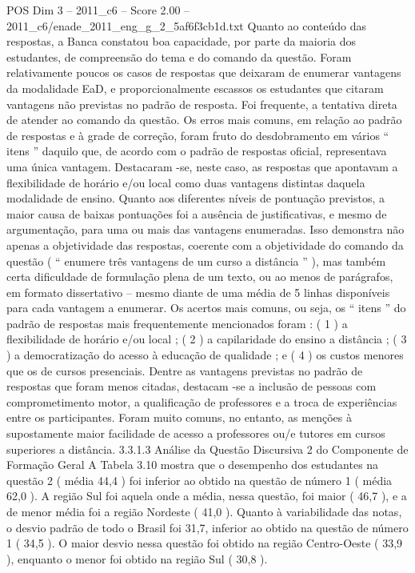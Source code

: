 \begin{textsample}{POS Dim 3 – 2011\_c6 – Score 2.00 – 2011\_c6/enade\_2011\_eng\_g\_2\_5af6f3cb1d.txt}
Quanto ao conteúdo das respostas, a Banca constatou boa capacidade, por parte da maioria dos estudantes, de compreensão do tema e do comando da questão.
Foram relativamente poucos os casos de respostas que deixaram de enumerar vantagens da modalidade EaD, e proporcionalmente escassos os estudantes que citaram vantagens não previstas no padrão de resposta.
Foi frequente, a tentativa direta de atender ao comando da questão.
Os erros mais comuns, em relação ao padrão de respostas e à grade de correção, foram fruto do desdobramento em vários “ itens ” daquilo que, de acordo com o padrão de respostas oficial, representava uma única vantagem.
Destacaram -se, neste caso, as respostas que apontavam a flexibilidade de horário e/ou local como duas vantagens distintas daquela modalidade de ensino.
Quanto aos diferentes níveis de pontuação previstos, a maior causa de baixas pontuações foi a ausência de justificativas, e mesmo de argumentação, para uma ou mais das vantagens enumeradas.
Isso demonstra não apenas a objetividade das respostas, coerente com a objetividade do comando da questão ( “ enumere três vantagens de um curso a distância ” ), mas também certa dificuldade de formulação plena de um texto, ou ao menos de parágrafos, em formato dissertativo – mesmo diante de uma média de 5 linhas disponíveis para cada vantagem a enumerar.
Os acertos mais comuns, ou seja, os “ itens ” do padrão de respostas mais frequentemente mencionados foram : ( 1 ) a flexibilidade de horário e/ou local ; ( 2 ) a capilaridade do ensino a distância ; ( 3 ) a democratização do acesso à educação de qualidade ; e ( 4 ) os custos menores que os de cursos presenciais.
Dentre as vantagens previstas no padrão de respostas que foram menos citadas, destacam -se a inclusão de pessoas com comprometimento motor, a qualificação de professores e a troca de experiências entre os participantes.
Foram muito comuns, no entanto, as menções à supostamente maior facilidade de acesso a professores ou/e tutores em cursos superiores a distância. 3.3.1.3 Análise da Questão Discursiva 2 do Componente de Formação Geral A Tabela 3.10 mostra que o desempenho dos estudantes na questão 2 ( média 44,4 ) foi inferior ao obtido na questão de número 1 ( média 62,0 ).
A região Sul foi aquela onde a média, nessa questão, foi maior ( 46,7 ), e a de menor média foi a região Nordeste ( 41,0 ).
Quanto à variabilidade das notas, o desvio padrão de todo o Brasil foi 31,7, inferior ao obtido na questão de número 1 ( 34,5 ).
O maior desvio nessa questão foi obtido na região Centro-Oeste ( 33,9 ), enquanto o menor foi obtido na região Sul ( 30,8 ).

\end{textsample}
